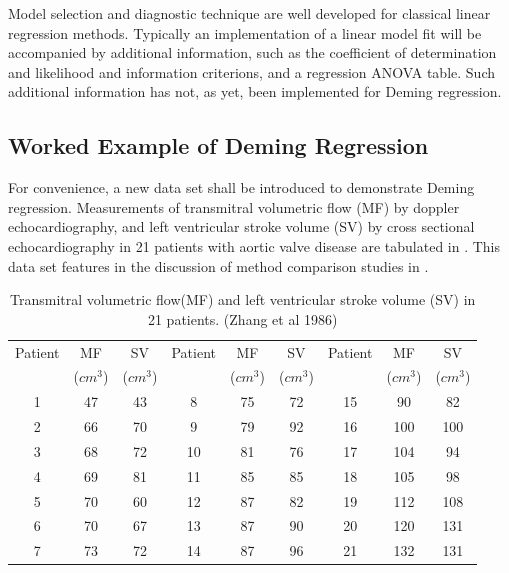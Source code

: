 \documentclass[12pt, a4paper]{report}
\theoremstyle{plain}
\theoremstyle{definition}
\theoremstyle{remark}
\begin{document}
Model selection and diagnostic technique are well developed for classical linear regression methods. Typically an implementation of a linear model fit will be accompanied by additional information, such as the coefficient of determination and likelihood and information criterions, and a regression ANOVA table. Such additional information has not, as yet, been implemented for Deming regression.




\subsection{Worked Example of Deming Regression}
For convenience, a new data set shall be introduced to demonstrate
Deming regression. Measurements of transmitral volumetric flow
(MF) by doppler echocardiography, and left ventricular stroke
volume (SV) by cross sectional echocardiography in 21 patients
with aortic valve disease are tabulated in \citet{zhang}. This
data set features in the discussion of method comparison studies
in \citet[p.398]{AltmanBook}.


\begin{table}[h!]
	\begin{center}
		\begin{tabular}{|c|c|c||c|c|c||c|c|c|}
			\hline
			Patient & MF  & SV  & Patient & MF  & SV  & Patient & MF  & SV \\
			&($cm^{3}$)&  ($cm^{3}$) & &($cm^{3}$)&  ($cm^{3}$) & &($cm^{3}$)&  ($cm^{3}$)
			\\
			\hline
			1 & 47 & 43 &  8 & 75 & 72 &  15 & 90 & 82 \\
			2 & 66 & 70 & 9 & 79 & 92 &  16 & 100 & 100 \\
			3 & 68 & 72 & 10 & 81 & 76 & 17 & 104 & 94 \\
			4 & 69 & 81 & 11 & 85 & 85 &  18 & 105 & 98 \\
			5 & 70 & 60 & 12 & 87 & 82 & 19 & 112 & 108 \\
			6 & 70 & 67 & 13 & 87 & 90 & 20 & 120 & 131 \\
			7 & 73 & 72 & 14 & 87 & 96 &  21 & 132 & 131 \\
			
			\hline
		\end{tabular}
		\caption{Transmitral volumetric flow(MF) and left ventricular
			stroke volume (SV) in 21 patients. (Zhang et al 1986)}
	\end{center}
\end{table}
\end{document}
